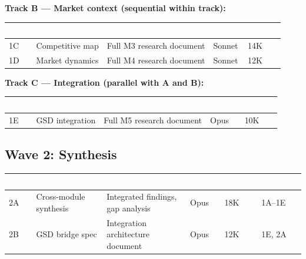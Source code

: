 \documentclass[11pt,letterpaper]{article}
\newcommand{\tableheader}[1]{\textbf{\sffamily\textcolor{white}{#1}}}
\begin{document}
\textbf{Track B --- Market context (sequential within track):}

\begin{center}
\begin{tabularx}{\textwidth}{C{0.8cm}L{3cm}XC{1.3cm}C{1.3cm}}
\toprule
{}
\tableheader{Task} & \tableheader{Description} & \tableheader{Produces} & \tableheader{Model} & \tableheader{Tokens} \\
\midrule
1C & Competitive map & Full M3 research document & Sonnet & 14K \\
1D & Market dynamics & Full M4 research document & Sonnet & 12K \\
\bottomrule
\end{tabularx}
\end{center}

\textbf{Track C --- Integration (parallel with A and B):}

\begin{center}
\begin{tabularx}{\textwidth}{C{0.8cm}L{3cm}XC{1.3cm}C{1.3cm}}
\toprule
{}
\tableheader{Task} & \tableheader{Description} & \tableheader{Produces} & \tableheader{Model} & \tableheader{Tokens} \\
\midrule
1E & GSD integration & Full M5 research document & Opus & 10K \\
\bottomrule
\end{tabularx}
\end{center}

\subsection{Wave 2: Synthesis}

\begin{center}
\begin{tabularx}{\textwidth}{C{0.8cm}L{3cm}XC{1.3cm}C{1.3cm}C{2cm}}
\toprule
{}
\tableheader{Task} & \tableheader{Description} & \tableheader{Produces} & \tableheader{Model} & \tableheader{Tokens} & \tableheader{Depends} \\
\midrule
2A & Cross-module synthesis & Integrated findings, gap analysis & Opus & 18K & 1A--1E \\
2B & GSD bridge spec & Integration architecture document & Opus & 12K & 1E, 2A \\
\bottomrule
\end{tabularx}
\end{center}
\end{document}
